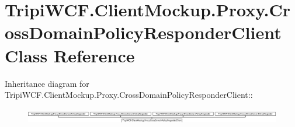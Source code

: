 \hypertarget{class_tripi_w_c_f_1_1_client_mockup_1_1_proxy_1_1_cross_domain_policy_responder_client}{
\section{TripiWCF.ClientMockup.Proxy.CrossDomainPolicyResponderClient Class Reference}
\label{class_tripi_w_c_f_1_1_client_mockup_1_1_proxy_1_1_cross_domain_policy_responder_client}
}
Inheritance diagram for TripiWCF.ClientMockup.Proxy.CrossDomainPolicyResponderClient::\begin{figure}[H]
\begin{center}
\leavevmode
\includegraphics[height=0.703518cm]{class_tripi_w_c_f_1_1_client_mockup_1_1_proxy_1_1_cross_domain_policy_responder_client}
\end{center}
\end{figure}
